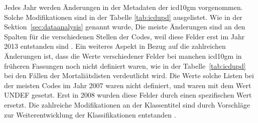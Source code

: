 Jedes Jahr werden Änderungen in der Metadaten der \ac{icd10gm} vorgenommen. Solche Modifikationen sind in der Tabelle \ref{tab:icdupd} ausgelistet. Wie in der Sektion~\ref{sec:dataanalysis} genannt wurde, Die meiste Änderungen sind an den Spalten für die verschiedenen Stellen der Codes, weil diese Felder erst im Jahr 2013 entstanden sind \cite{readme13}. Ein weiteres Aspekt in Bezug auf die zahlreichen Änderungen ist, dass die Werte verschiedener Felder bei manchen \ac{icd10gm} in früheren Fassungen noch nicht definiert waren, wie in der Tabelle~\ref{tab:icdupd} bei den Fällen der Mortaliätslisten verdeutlicht wird. Die Werte solche Listen bei der meisten Codes im Jahr 2007 waren nicht definiert, und waren mit dem Wert \textsf{UNDEF} gesetzt. Erst in 2008 wurden diese Felder durch einen spezifischen Wert ersetzt. Die zahlreiche Modifikationen an der Klassentitel sind durch Vorschläge zur Weiterentwicklung der Klassifikationen entstanden \cite{diab09, komm14}. 


